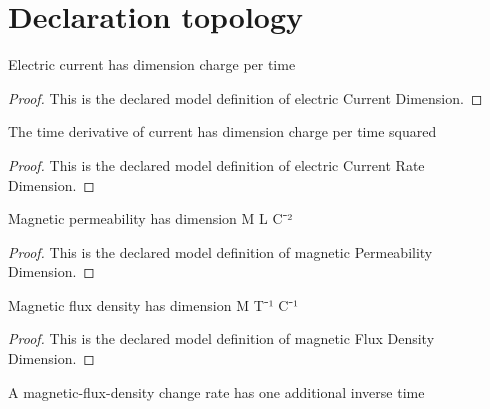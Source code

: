 \section{Declaration topology}
\begin{definition}
  \label{def:physics:phyx-mini-0930:phyxminiproblems-problemphyxmini0930-electriccurrentdimension}
  Electric current has dimension charge per time
\end{definition}
\begin{proof}
  This is the declared model definition of electric Current Dimension.
\end{proof}
\begin{definition}
  \label{def:physics:phyx-mini-0930:phyxminiproblems-problemphyxmini0930-electriccurrentratedimension}
  The time derivative of current has dimension charge per time squared
\end{definition}
\begin{proof}
  This is the declared model definition of electric Current Rate Dimension.
\end{proof}
\begin{definition}
  \label{def:physics:phyx-mini-0930:phyxminiproblems-problemphyxmini0930-magneticpermeabilitydimension}
  Magnetic permeability has dimension M L C⁻²
\end{definition}
\begin{proof}
  This is the declared model definition of magnetic Permeability Dimension.
\end{proof}
\begin{definition}
  \label{def:physics:phyx-mini-0930:phyxminiproblems-problemphyxmini0930-magneticfluxdensitydimension}
  Magnetic flux density has dimension M T⁻¹ C⁻¹
\end{definition}
\begin{proof}
  This is the declared model definition of magnetic Flux Density Dimension.
\end{proof}
\begin{definition}
  \label{def:physics:phyx-mini-0930:phyxminiproblems-problemphyxmini0930-magneticfluxdensityratedimension}
  A magnetic-flux-density change rate has one additional inverse time
\end{definition}
